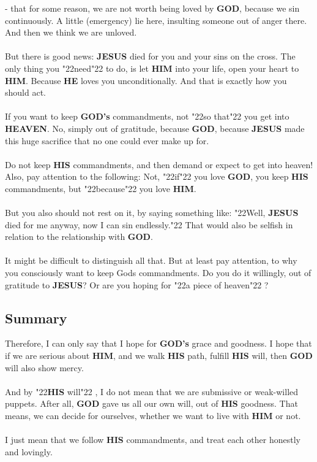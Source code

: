 \documentclass[12pt,a5paper]{article}
\newcommand{\God}[0]{\textbf{GOD}}
\newcommand{\Gods}[0]{\textbf{GOD's}}
\newcommand{\He}[0]{\textbf{HE}}
\newcommand{\Heaven}[0]{\textbf{HEAVEN}}
\newcommand{\Him}[0]{\textbf{HIM}}
\newcommand{\His}[0]{\textbf{HIS}}
\newcommand{\Jesus}[0]{\textbf{JESUS}}
\newcommand{\q}[1]{\char"22{#1}\char"22 }
\begin{document}
		- that for some reason,
		we are not worth being loved by {\God},
		because we sin continuously.
		A little (emergency) lie here,
		insulting someone out of anger there.
		And then we think we are unloved.
		\\
		\\
		But there is good news:
		{\Jesus} died for you and your sins on the cross.
		The only thing you \q{need} to do,
		is let {\Him} into your life,
		open your heart to {\Him}.
		Because {\He} loves you unconditionally.
		And that is exactly how you should act.
		\\
		\\
		If you want to keep {\Gods} commandments,
		not \q{so that} you get into {\Heaven}.
		No,
		simply out of gratitude,
		because {\God},
		because {\Jesus} made this huge sacrifice that no one could ever make up for.
		\\
		\\
		Do not keep {\His} commandments,
		and then demand or expect to get into heaven!
		Also,
		pay attention to the following:
		Not,
		\q{if} you love {\God},
		you keep {\His} commandments,
		but \q{because} you love {\Him}.
		\\
		\\
		But you also should not rest on it,
		by saying something like:
		\q{Well,
		{\Jesus} died for me anyway,
		now I can sin endlessly.}
		That would also be selfish in relation to the relationship with {\God}.
		\\
		\\
		It might be difficult to distinguish all that.
		But at least pay attention,
		to why you consciously want to keep {Gods} commandments.
		Do you do it willingly,
		out of gratitude to {\Jesus}?
		Or are you hoping for \q{a piece of heaven}?
	
	\newpage
	\subsection{Summary}
		Therefore,
		I can only say that I hope for {\Gods} grace and goodness.
		I hope that if we are serious about {\Him},
		and we walk {\His} path,
		fulfill {\His} will,
		then {\God} will also show mercy.
		\\
		\\
		And by \q{{\His} will},
		I do not mean that we are submissive or weak-willed puppets.
		After all,
		{\God} gave us all our own will,
		out of {\His} goodness.
		That means,
		we can decide for ourselves,
		whether we want to live with {\Him} or not.
		\\
		\\
		I just mean that we follow {\His} commandments,
		and treat each other honestly and lovingly.
\end{document}
